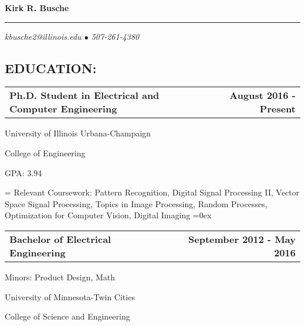 \documentclass[10pt, letterpaper]{article}
\makeatletter
\newcommand{\headerrow}[2]
{\begin{tabular*}{\linewidth}{l@{\extracolsep{\fill}}r}
	#1 &
	#2 \\
\end{tabular*}}
\newcommand{\sansserif}{\cabin}
\makeatother
\begin{document}
{\sansserif \LARGE \textbf{Kirk R. Busche}}

\rule{\textwidth}{0.5ex}
\vspace{-2em}
\begin{center}
	{\sansserif\small \textit{kbusche2@illinois.edu $\bullet$ 507-261-4380}}
\end{center}

\subsection*{\sansserif EDUCATION:}
\headerrow
	{\textbf{Ph.D. Student in Electrical and Computer Engineering}}
	{\textbf{August 2016 - Present}}

University of Illinois Urbana-Champaign

College of Engineering

GPA: 3.94

\newlength{\mylength}
\settowidth{\mylength}{Relevant Courseworks:}
\hangindent=\mylength
Relevant Coursework: Pattern Recognition, Digital Signal Processing II, Vector
Space Signal Processing, Topics in Image Processing, Random Processes,
Optimization for Computer Vision, Digital Imaging
\hangindent=0ex
\\

\begin{comment}
\headerrow
	{\textbf{Master of Science in Electrical and Computer Engineering}}
	{\textbf{Expected May 2018}}

University of Illinois Urbana-Champaign

College of Engineering

GPA: 3.94

\newlength{\mylength}
\settowidth{\mylength}{Relevant Courseworks:}
\hangindent=\mylength
Relevant Coursework: Pattern Recognition, Digital Signal Processing II, Vector Space Signal Processing, Topics in Image Processing, Random Processes, Optimization for Computer Vision, Digital Imaging
\hangindent=0ex
\\
\end{comment}

\headerrow
	{\textbf{Bachelor of Electrical Engineering}}
	{\textbf{September 2012 - May 2016}}

Minors: Product Design, Math

University of Minnesota-Twin Cities

College of Science and Engineering
\end{document}
